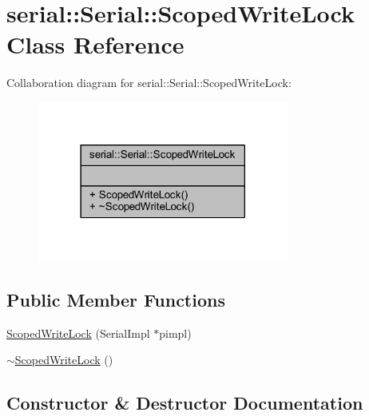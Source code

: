 \hypertarget{class_serial_1_1_scoped_write_lock}{}\section{serial\+:\+:Serial\+:\+:Scoped\+Write\+Lock Class Reference}
\label{class_serial_1_1_scoped_write_lock}


Collaboration diagram for serial\+:\+:Serial\+:\+:Scoped\+Write\+Lock\+:\nopagebreak
\begin{figure}[H]
\begin{center}
\leavevmode
\includegraphics[width=234pt]{class_serial_1_1_scoped_write_lock__coll__graph}
\end{center}
\end{figure}
\subsection*{Public Member Functions}
\begin{DoxyCompactItemize}
\item 
\mbox{\hyperlink{class_serial_1_1_scoped_write_lock_a662173968431aee3d6f204c354b20225}{Scoped\+Write\+Lock}} (Serial\+Impl $\ast$pimpl)
\item 
\mbox{\hyperlink{class_serial_1_1_scoped_write_lock_aebeef5b2d16f409b60094cfac092ada2}{$\sim$\+Scoped\+Write\+Lock}} ()
\end{DoxyCompactItemize}


\subsection{Constructor \& Destructor Documentation}
\mbox{\label{class_serial_1_1_scoped_write_lock_a662173968431aee3d6f204c354b20225}} 
